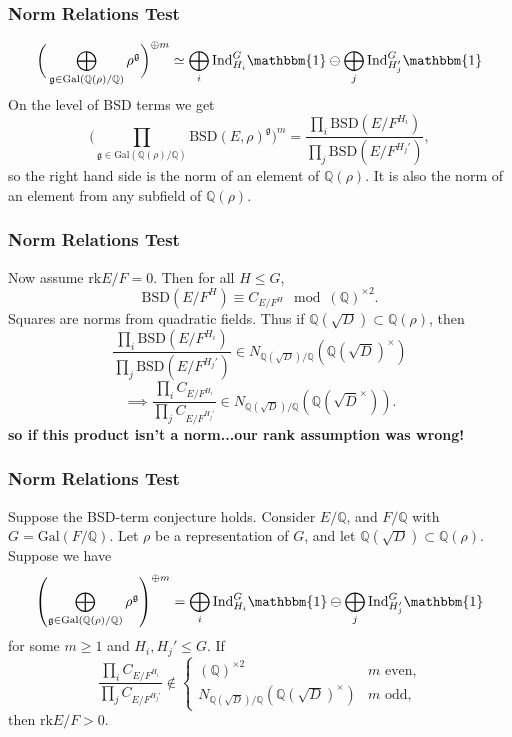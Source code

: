 \documentclass{beamer}
\newcommand{\Gal}{\mathrm{Gal}}
\newcommand{\BSD}{\mathrm{BSD}}
\newcommand{\rk}{\mathrm{rk}}
\newcommand{\trivial}{\mathbbm{1}}
\newcommand{\Ind}{\mathrm{Ind}}
\newcommand{\QQ}{\mathbb{Q}}
\newcommand{\fg}{\mathfrak{g}}
\newcommand{\bQ}{\mathbb{Q}}
\theoremstyle{plain}
\begin{document}
\begin{frame}
    \frametitle{Norm Relations Test}
    $$\bigg(\bigoplus_{\fg \in \Gal(\bQ(\rho) / \bQ)} \rho^{\fg}\bigg)^{\oplus m} \simeq \bigoplus_{i} \Ind_{H_i}^G \trivial \ominus \bigoplus_{j} \Ind_{H_j'}^G \trivial$$ \pause
    On the level of BSD terms we get
    $$\bigg(\prod_{\fg \in \Gal(\bQ(\rho) / \bQ)} \BSD(E, \rho)^{\fg}\bigg)^m = \frac{\prod_i \BSD(E / F^{H_i})}{\prod_j \BSD(E / F^{H_j'})} ,$$
    \pause so the right hand side is the norm of an element of $\bQ(\rho)$. \pause It is also the norm of an element from any subfield of $\bQ(\rho)$. 
\end{frame}

\begin{frame}
    \frametitle{Norm Relations Test}
    Now assume $\rk E / F = 0$. Then for all $H \leq G$, 
    $$ \BSD(E / F^{H}) \equiv C_{E / F^H} \mod (\bQ)^{\times 2}.$$ \pause
    Squares are norms from quadratic fields. \pause Thus if $\bQ(\sqrt{D}) \subset \bQ(\rho)$, then 
   $$\frac{\prod_i \BSD(E / F^{H_i})}{\prod_j \BSD(E / F^{H_j'})} \in N_{\bQ(\sqrt{D}) / \bQ}(\bQ(\sqrt{D})^{\times})$$ \pause $$\implies 
   \frac{\prod_i C_{E / F^{H_i}}}{\prod_j C_{E / F^{H_j'}}} \in N_{\bQ(\sqrt{D}) / \bQ}(\bQ(\sqrt{D}^{\times})). $$\pause
   \textbf{so if this product isn't a norm...\pause our rank assumption was wrong!}
\end{frame}

\begin{frame}
    \frametitle{Norm Relations Test}
    \begin{theorem}\label{thm_positive_rank}
    \small{  Suppose the BSD-term conjecture holds. Consider $E/\QQ$, and $F/\QQ$  with $G = \Gal(F / \bQ)$. Let $\rho$ be a representation of $G$, and let $\bQ(\sqrt{D}) \subset \bQ(\rho)$. Suppose we have  
        $$\left(\bigoplus_{\mathfrak{g}\in\Gal(\QQ(\rho)/\QQ)}\rho^{\mathfrak{g}}\right)^{\oplus m}=\bigoplus_i\Ind_{H_i}^G\mathbbm{1}\ominus\bigoplus_j\Ind_{H'_j}^G\mathbbm{1}$$
        for some $m\geq 1$ and $H_i, H_j' \leq G$. If 
        $$\frac{\prod_i C_{E/F^{H_i}}}{\prod_j C_{E/F^{H_j'}}} \not\in
        \begin{cases}
            (\bQ)^{\times 2} & m \text{ even,}\\
            N_{\bQ(\sqrt{D}) / \bQ}(\bQ(\sqrt{D})^{\times}) & m \text{ odd,}
        \end{cases}
        $$
        then $\rk E / F > 0.$ }
    \end{theorem}
\end{frame}
\end{document}
